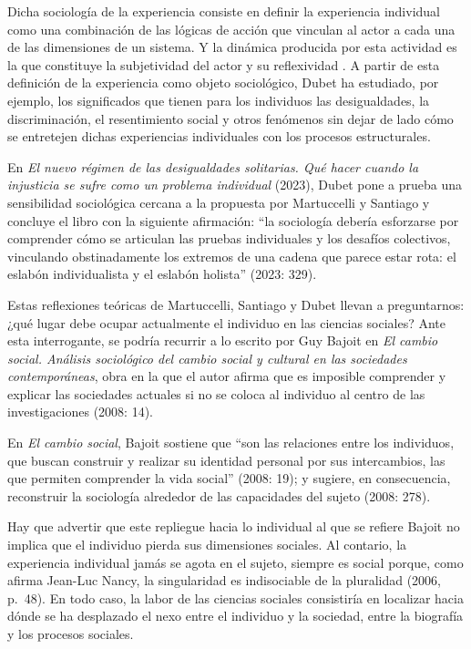 \documentclass[
  spanish,
  11pt,
  a4paper,
]{scrbook}
\begin{document}
Dicha sociología de la experiencia consiste en definir la experiencia
individual como una combinación de las lógicas de acción que vinculan al
actor a cada una de las dimensiones de un sistema. Y la dinámica
producida por esta actividad es la que constituye la subjetividad del
actor y su reflexividad \autocite[96]{Dubet2010}. A partir de esta
definición de la experiencia como objeto sociológico, Dubet ha
estudiado, por ejemplo, los significados que tienen para los individuos
las desigualdades, la discriminación, el resentimiento social y otros
fenómenos sin dejar de lado cómo se entretejen dichas experiencias
individuales con los procesos estructurales.

En \emph{El nuevo régimen de las desigualdades solitarias. Qué hacer
cuando la injusticia se sufre como un problema individual} (2023), Dubet
pone a prueba una sensibilidad sociológica cercana a la propuesta por
Martuccelli y Santiago y concluye el libro con la siguiente afirmación:
``la sociología debería esforzarse por comprender cómo se articulan las
pruebas individuales y los desafíos colectivos, vinculando
obstinadamente los extremos de una cadena que parece estar rota: el
eslabón individualista y el eslabón holista'' (2023: 329).

Estas reflexiones teóricas de Martuccelli, Santiago y Dubet llevan a
preguntarnos: ¿qué lugar debe ocupar actualmente el individuo en las
ciencias sociales? Ante esta interrogante, se podría recurrir a lo
escrito por Guy Bajoit en \emph{El cambio social. Análisis sociológico
del cambio social y cultural en las sociedades contemporáneas}, obra en
la que el autor afirma que es imposible comprender y explicar las
sociedades actuales si no se coloca al individuo al centro de las
investigaciones (2008: 14).

En \emph{El cambio social}, Bajoit sostiene que ``son las relaciones
entre los individuos, que buscan construir y realizar su identidad
personal por sus intercambios, las que permiten comprender la vida
social'' (2008: 19); y sugiere, en consecuencia, reconstruir la
sociología alrededor de las capacidades del sujeto (2008: 278).

Hay que advertir que este repliegue hacia lo individual al que se
refiere Bajoit no implica que el individuo pierda sus dimensiones
sociales. Al contario, la experiencia individual jamás se agota en el
sujeto, siempre es social porque, como afirma Jean-Luc Nancy, la
singularidad es indisociable de la pluralidad (2006, p.~48). En todo
caso, la labor de las ciencias sociales consistiría en localizar hacia
dónde se ha desplazado el nexo entre el individuo y la sociedad, entre
la biografía y los procesos sociales.
\end{document}

